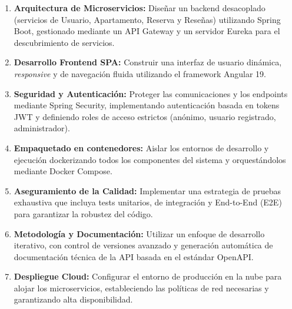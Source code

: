 \begin{enumerate}
    \item \textbf{Arquitectura de Microservicios:} Diseñar un backend desacoplado (servicios de Usuario, Apartamento, Reserva y Reseñas) utilizando Spring Boot, gestionado mediante un API Gateway y un servidor Eureka para el descubrimiento de servicios.

    \item \textbf{Desarrollo Frontend SPA:} Construir una interfaz de usuario dinámica, \textit{responsive} y de navegación fluida utilizando el framework Angular 19.
    
    \item \textbf{Seguridad y Autenticación:} Proteger las comunicaciones y los endpoints mediante Spring Security, implementando autenticación basada en tokens JWT y definiendo roles de acceso estrictos (anónimo, usuario registrado, administrador).
    
    \item \textbf{Empaquetado en contenedores:} Aislar los entornos de desarrollo y ejecución dockerizando todos los componentes del sistema y orquestándolos mediante Docker Compose.
    
    \item \textbf{Aseguramiento de la Calidad:} Implementar una estrategia de pruebas exhaustiva que incluya tests unitarios, de integración y End-to-End (E2E) para garantizar la robustez del código.
    
    \item \textbf{Metodología y Documentación:} Utilizar un enfoque de desarrollo iterativo, con control de versiones avanzado y generación automática de documentación técnica de la API basada en el estándar OpenAPI.
    
    \item \textbf{Despliegue Cloud:} Configurar el entorno de producción en la nube para alojar los microservicios, estableciendo las políticas de red necesarias y garantizando alta disponibilidad.
\end{enumerate}
